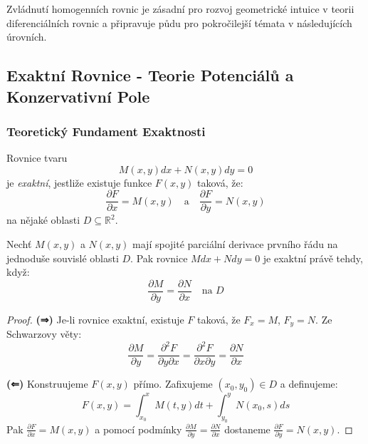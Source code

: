 Zvládnutí homogenních rovnic je zásadní pro rozvoj geometrické intuice v teorii diferenciálních rovnic a připravuje půdu pro pokročilejší témata v následujících úrovních.


\subsection{Exaktní Rovnice - Teorie Potenciálů a Konzervativní Pole}
\label{subsec:exaktni-rovnice}

\subsubsection{Teoretický Fundament Exaktnosti}
\label{subsubsec:teoreticky-fundament-exaktni}

\begin{definition}
Rovnice tvaru
\[
M(x, y)dx + N(x, y)dy = 0
\]
je \emph{exaktní}, jestliže existuje funkce $F(x, y)$ taková, že:
\[
\frac{\partial F}{\partial x} = M(x, y) \quad \text{a} \quad \frac{\partial F}{\partial y} = N(x, y)
\]
na nějaké oblasti $D \subseteq \mathbb{R}^2$.
\end{definition}

\vspace{0.6\baselineskip}

\begin{theorem}
Nechť $M(x, y)$ a $N(x, y)$ mají spojité parciální derivace prvního řádu na jednoduše souvislé oblasti $D$. Pak rovnice $M dx + N dy = 0$ je exaktní právě tehdy, když:
\[
\frac{\partial M}{\partial y} = \frac{\partial N}{\partial x} \quad \text{na } D
\]
\end{theorem}

\vspace{0.4\baselineskip}

\begin{proof}
\textbf{(⇒)} Je-li rovnice exaktní, existuje $F$ taková, že $F_x = M$, $F_y = N$. Ze Schwarzovy věty:
\[
\frac{\partial M}{\partial y} = \frac{\partial^2 F}{\partial y \partial x} = \frac{\partial^2 F}{\partial x \partial y} = \frac{\partial N}{\partial x}
\]

\textbf{(⇐)} Konstruujeme $F(x, y)$ přímo. Zafixujeme $(x_0, y_0) \in D$ a definujeme:
\[
F(x, y) = \int_{x_0}^x M(t, y)dt + \int_{y_0}^y N(x_0, s)ds
\]
Pak $\frac{\partial F}{\partial x} = M(x, y)$ a pomocí podmínky $\frac{\partial M}{\partial y} = \frac{\partial N}{\partial x}$ dostaneme $\frac{\partial F}{\partial y} = N(x, y)$.
\end{proof}

